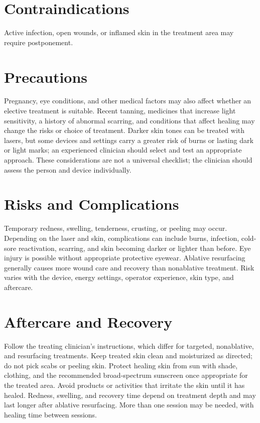\section*{Contraindications}
Active infection, open wounds, or inflamed skin in the treatment area may require postponement.

\section*{Precautions}
Pregnancy, eye conditions, and other medical factors may also affect whether an elective treatment is suitable. Recent tanning, medicines that increase light sensitivity, a history of abnormal scarring, and conditions that affect healing may change the risks or choice of treatment. Darker skin tones can be treated with lasers, but some devices and settings carry a greater risk of burns or lasting dark or light marks; an experienced clinician should select and test an appropriate approach. These considerations are not a universal checklist; the clinician should assess the person and device individually.

\section*{Risks and Complications}
Temporary redness, swelling, tenderness, crusting, or peeling may occur. Depending on the laser and skin, complications can include burns, infection, cold-sore reactivation, scarring, and skin becoming darker or lighter than before. Eye injury is possible without appropriate protective eyewear. Ablative resurfacing generally causes more wound care and recovery than nonablative treatment. Risk varies with the device, energy settings, operator experience, skin type, and aftercare.

\section*{Aftercare and Recovery}
Follow the treating clinician's instructions, which differ for targeted, nonablative, and resurfacing treatments. Keep treated skin clean and moisturized as directed; do not pick scabs or peeling skin. Protect healing skin from sun with shade, clothing, and the recommended broad-spectrum sunscreen once appropriate for the treated area. Avoid products or activities that irritate the skin until it has healed. Redness, swelling, and recovery time depend on treatment depth and may last longer after ablative resurfacing. More than one session may be needed, with healing time between sessions.

